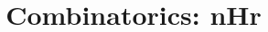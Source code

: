 \documentclass[a4paper,12pt]{article}
\begin{document}
\title{Combinatorics: nHr}
\newcommand\event{S.3,4 Elite Mathematics Training}
\newcommand\learningobjective{
\item Have the general picture of combinatorics and permutations
\item Revise the concept of Sticks and Balls
\item Learn the concept of nHr
}

\myfrontpage





\begin{question}[]{4}
    
    
    
\end{question}
\end{document}

